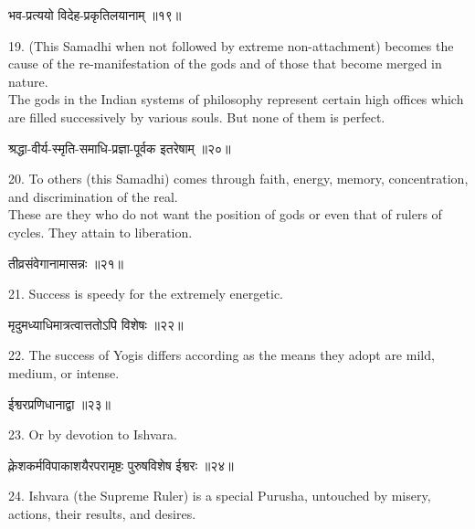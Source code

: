 \begin{center}
\begin{sanskrit}
भव-प्रत्ययो विदेह-प्रकृतिलयानाम् ॥१९॥
\end{sanskrit}
\end{center}
19. (This Samadhi when not followed by extreme non-attachment)
becomes the cause of the re-manifestation of the gods and of those that
become merged in nature. \\

The gods in the Indian systems of philosophy represent certain
high offices which are filled successively by various souls. But none
of them is perfect. \\

\begin{center}
\begin{sanskrit}
श्रद्धा-वीर्य-स्मृति-समाधि-प्रज्ञा-पूर्वक
इतरेषाम् ॥२०॥
\end{sanskrit}
\end{center}
20. To others (this Samadhi) comes through faith, energy,
memory, concentration, and discrimination of the real. \\

These are they who do not want the position of gods or even
that of rulers of cycles. They attain to liberation.\\

\begin{center}
\begin{sanskrit}
तीव्रसंवेगानामासन्नः ॥२१॥
\end{sanskrit}
\end{center}
21. Success is speedy for the extremely energetic. \\

\begin{center}
\begin{sanskrit}
मृदुमध्याधिमात्रत्वात्ततोऽपि विशेषः ॥२२॥
\end{sanskrit}
\end{center}
22. The success of Yogis differs according as the means they
adopt are mild, medium, or intense. \\

\begin{center}
\begin{sanskrit}
ईश्वरप्रणिधानाद्वा ॥२३॥
\end{sanskrit}
\end{center}
23. Or by devotion to Ishvara. \\

\begin{center}
\begin{sanskrit}
क्लेशकर्मविपाकाशयैरपरामृष्टः पुरुषविशेष
ईश्वरः ॥२४॥
\end{sanskrit}
\end{center}
24. Ishvara (the Supreme Ruler) is a special Purusha,
untouched by misery, actions, their results, and desires. \\

